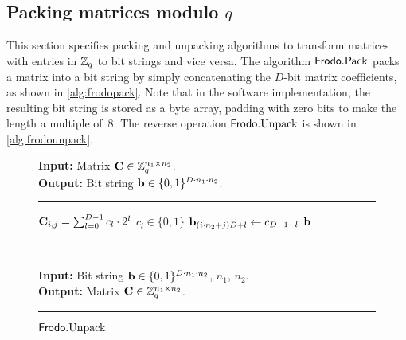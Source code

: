 \subsection{Packing matrices modulo $q$}
\label{sec:pack}

This section specifies packing and unpacking algorithms to transform
matrices with entries in $\mathbb{Z}_q$ to bit strings and vice versa. The
algorithm $\Frodo.\Pack$ packs a matrix into a bit string by simply
concatenating the $D$-bit matrix coefficients, as shown in
\autoref{alg:frodopack}. Note that in the software implementation, the
resulting bit string is stored as a byte array, padding with zero bits
to make the length a multiple of~$8$. The reverse operation
$\textsf{\upshape\mdseries Frodo}.\textrm{\upshape\mdseries Unpack}$ is shown in \autoref{alg:frodounpack}.

\begin{figure}[h!]
\centering
\begin{minipage}[t]{0.45\textwidth}
\begin{algorithm}[H]
\caption{\label{alg:frodopack} $\Frodo.\Pack$}
{\bf Input:} Matrix $\mathbf{C} \in \mathbb{Z}_q^{n_1\times n_2}$.\\
{\bf Output:} Bit string $\mathbf{b} \in \{0,1\}^{D\cdot n_1\cdot n_2}$.\\[-1.5ex]
\rule{\linewidth}{.5pt}
\vspace{-0.5cm}
\begin{algorithmic}[1]
    \STATE $\mathbf{C}_{i,j} = \sum_{l=0}^{D-1}c_l \cdot 2^l$  $c_l\in \{0,1\}$
    \STATE $\mathbf{b}_{(i\cdot n_2  + j)D+l} \gets c_{D-1-l}$ 
    \ENDFOR
    \ENDFOR
    \ENDFOR
    \RETURN $\mathbf{b}$
\end{algorithmic}
\end{algorithm}
\end{minipage}
~
\begin{minipage}[t]{0.5\textwidth}
\begin{algorithm}[H]
\caption{\label{alg:frodounpack} $\textsf{\upshape\mdseries Frodo}.\textrm{\upshape\mdseries Unpack}$}
{\bf Input:}  Bit string $\mathbf{b} \in \{0,1\}^{D\cdot n_1\cdot n_2}$, $n_1$, $n_2$.\\
{\bf Output:} Matrix $\mathbf{C} \in \mathbb{Z}_q^{n_1\times n_2}$.\\[-1.5ex]
\rule{\linewidth}{.5pt}

\end{algorithm}
\end{minipage}
\end{figure}
